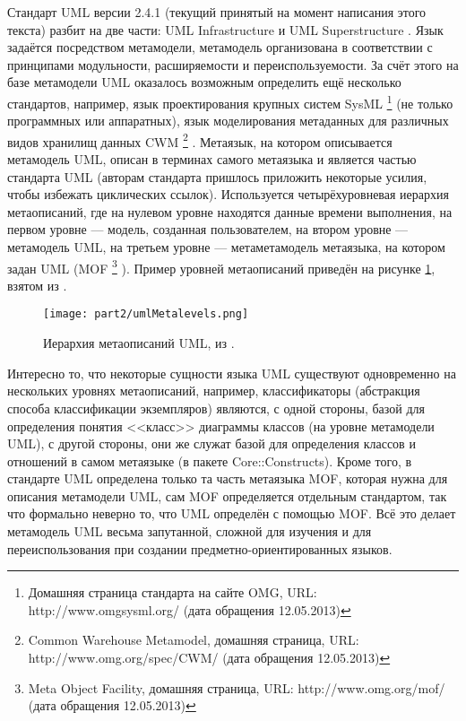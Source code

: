 Стандарт UML версии 2.4.1 (текущий принятый на момент написания этого текста) разбит 
на две части: UML Infrastructure \cite{omg2011infrastructure} и UML Superstructure 
\cite{omg2011superstructure}. Язык задаётся посредством метамодели, метамодель организована 
в соответствии с принципами модульности, расширяемости и переиспользуемости. За счёт 
этого на базе метамодели UML оказалось возможным определить ещё несколько стандартов, например, язык проектирования крупных систем SysML%
\footnote{Домашняя страница стандарта на сайте OMG, URL: http://www.omgsysml.org/ (дата обращения 12.05.2013)}
(не только программных или аппаратных), язык моделирования метаданных для различных видов хранилищ данных CWM%
\footnote{Common Warehouse Metamodel, домашняя страница, URL: http://www.omg.org/spec/CWM/ (дата обращения 12.05.2013)}%
. Метаязык, на котором описывается метамодель UML, описан в терминах самого метаязыка и является 
частью стандарта UML (авторам стандарта пришлось приложить некоторые усилия, чтобы 
избежать циклических ссылок). Используется четырёхуровневая иерархия метаописаний, 
где на нулевом уровне находятся данные времени выполнения, на первом уровне --- модель, 
созданная пользователем, на втором уровне --- метамодель UML, на третьем уровне --- метаметамодель метаязыка, на котором задан UML (MOF%
\footnote{Meta Object Facility, домашняя страница, URL: http://www.omg.org/mof/ (дата обращения 12.05.2013)}%
). Пример уровней метаописаний приведён на рисунке \ref{umlMetalevels}, взятом из \cite{omg2011infrastructure}.

\begin{figure} [ht]
	\begin{center}
		\texttt{[image: part2/umlMetalevels.png]}
		\caption{Иерархия метаописаний UML, из \cite{omg2011infrastructure}.}
		\label{umlMetalevels}
	\end{center}
\end{figure}

Интересно то, что некоторые сущности языка UML существуют одновременно на нескольких 
уровнях метаописаний, например, классификаторы (абстракция способа классификации экземпляров) 
являются, с одной стороны, базой для определения понятия <<класс>> диаграммы классов 
(на уровне метамодели UML), с другой стороны, они же служат базой для определения 
классов и отношений в самом метаязыке (в пакете Core::Constructs). Кроме того, в стандарте 
UML определена только та часть метаязыка MOF, которая нужна для описания метамодели UML, 
сам MOF определяется отдельным стандартом, так что формально неверно то, что UML определён 
с помощью MOF. Всё это делает метамодель UML весьма запутанной, сложной для изучения 
и для переиспользования при создании предметно-ориентированных языков.

